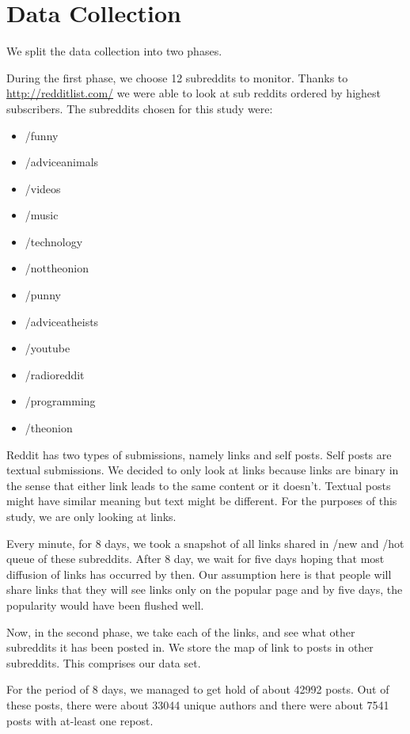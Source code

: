 \documentclass{article} %
\begin{document}
\section{Data Collection}

We split the data collection into two phases. 

During the first phase, we choose 12 subreddits to monitor. Thanks to \href{http://redditlist.com/}{http://redditlist.com/} we were able to look at sub reddits ordered by highest subscribers. The subreddits chosen for this study were: 

\begin{itemize}
\item /funny
\item /adviceanimals
\item /videos
\item /music
\item /technology
\item /nottheonion
\item /punny
\item /adviceatheists
\item /youtube
\item /radioreddit
\item /programming
\item /theonion
\end{itemize}

Reddit has two types of submissions, namely links and self posts. Self posts are textual submissions. We decided to only look at links because links are binary in the sense that either link leads to the same content or it doesn't. Textual posts might have similar meaning but text might be different. For the purposes of this study, we are only looking at links. 

Every minute, for 8 days, we took a snapshot of all links shared in /new and /hot queue of these subreddits. After 8 day, we wait for five days hoping that most diffusion of links has occurred by then. Our assumption here is that people will share links that they will see links only on the popular page and by five days, the popularity would have been flushed well. 

Now, in the second phase, we take each of the links, and see what other subreddits it has been posted in. We store the map of link to posts in other subreddits. This comprises our data set. 

For the period of 8 days, we managed to get hold of about 42992 posts. Out of these posts, there were about 33044 unique authors and there were about 7541 posts with at-least one repost.
\end{document}
